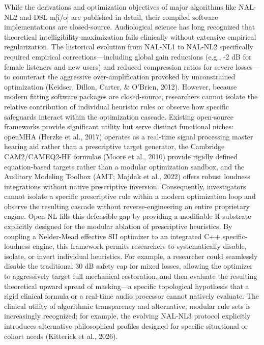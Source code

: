 \documentclass[
  12pt,
]{article}
\begin{document}
While the derivations and optimization objectives of major algorithms
like NAL-NL2 and DSL m{[}i/o{]} are published in detail, their compiled
software implementations are closed-source. Audiological science has
long recognized that theoretical intelligibility-maximization fails
clinically without extensive empirical regularization. The historical
evolution from NAL-NL1 to NAL-NL2 specifically required empirical
corrections---including global gain reductions (e.g., -2 dB for female
listeners and new users) and reduced compression ratios for severe
losses---to counteract the aggressive over-amplification provoked by
unconstrained optimization (Keidser, Dillon, Carter, \& O'Brien, 2012).
However, because modern fitting software packages are closed-source,
researchers cannot isolate the relative contribution of individual
heuristic rules or observe how specific safeguards interact within the
optimization cascade. Existing open-source frameworks provide
significant utility but serve distinct functional niches: openMHA
(Herzke et al., 2017) operates as a real-time signal processing master
hearing aid rather than a prescriptive target generator, the Cambridge
CAM2/CAMEQ2-HF formulae (Moore et al., 2010) provide rigidly defined
equation-based targets rather than a modular optimization sandbox, and
the Auditory Modeling Toolbox (AMT; Majdak et al., 2022) offers robust
loudness integrations without native prescriptive inversion.
Consequently, investigators cannot isolate a specific prescriptive rule
within a modern optimization loop and observe the resulting cascade
without reverse-engineering an entire proprietary engine. Open-NL fills
this defensible gap by providing a modifiable R substrate explicitly
designed for the modular ablation of prescriptive heuristics. By
coupling a Nelder-Mead effective SII optimizer to an integrated C++
specific-loudness engine, this framework permits researchers to
systematically disable, isolate, or invert individual heuristics. For
example, a researcher could seamlessly disable the traditional 30 dB
safety cap for mixed losses, allowing the optimizer to aggressively
target full mechanical restoration, and then evaluate the resulting
theoretical upward spread of masking---a specific topological hypothesis
that a rigid clinical formula or a real-time audio processor cannot
natively evaluate. The clinical utility of algorithmic transparency and
alternative, modular rule sets is increasingly recognized; for example,
the evolving NAL-NL3 protocol explicitly introduces alternative
philosophical profiles designed for specific situational or cohort needs
(Kitterick et al., 2026).
\end{document}
